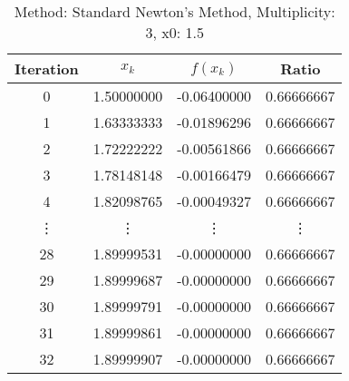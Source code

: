 \begin{table}
\centering
\caption{Method: Standard Newton's Method, Multiplicity: 3, x0: 1.5}
\label{tab:table_Standard_Newton's_Method_3_1_5}
\begin{tabular}{c c c c}
\toprule
Iteration &      $x_k$ &    $f(x_k)$ &      Ratio \\
\midrule
        0 & 1.50000000 & -0.06400000 & 0.66666667 \\
        1 & 1.63333333 & -0.01896296 & 0.66666667 \\
        2 & 1.72222222 & -0.00561866 & 0.66666667 \\
        3 & 1.78148148 & -0.00166479 & 0.66666667 \\
        4 & 1.82098765 & -0.00049327 & 0.66666667 \\
   \vdots &     \vdots &      \vdots &     \vdots \\
       28 & 1.89999531 & -0.00000000 & 0.66666667 \\
       29 & 1.89999687 & -0.00000000 & 0.66666667 \\
       30 & 1.89999791 & -0.00000000 & 0.66666667 \\
       31 & 1.89999861 & -0.00000000 & 0.66666667 \\
       32 & 1.89999907 & -0.00000000 & 0.66666667 \\
\bottomrule
\end{tabular}
\end{table}
